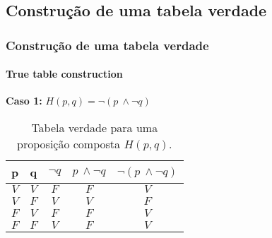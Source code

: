 \subsection{Construção de uma tabela verdade}
%
{
\begin{frame}[t]
    \frametitle{Construção de uma tabela verdade}
    \framesubtitle{True table construction}
    \begin{exampleblock}{}
        \textbf{Caso 1:} $H(p,q) = \lnot (p~\land \lnot q)$
    \end{exampleblock}
    \begin{table}[T]
        \caption{Tabela verdade para uma proposição composta $H(p,q)$.}
        \label{tab:tabela-caso-1}
        \begin{tabular}{|c|c|c|c|c|}
            \hline
            \rowcolor[HTML]{EFEFEF} 
            \textbf{p} & \textbf{q} & $\lnot q$ & $p~\land \lnot q$ & $\lnot (p~\land \lnot q)$ \\ \hline
            $V$ & $V$ & $F$ & $F$ & $V$ \\ \hline
            $V$ & $F$ & $V$ & $V$ & $F$ \\ \hline
            $F$ & $V$ & $F$ & $F$ & $V$ \\ \hline
            $F$ & $F$ & $V$ & $F$ & $V$ \\ \hline
        \end{tabular}
    \end{table}
\end{frame}
}
%
